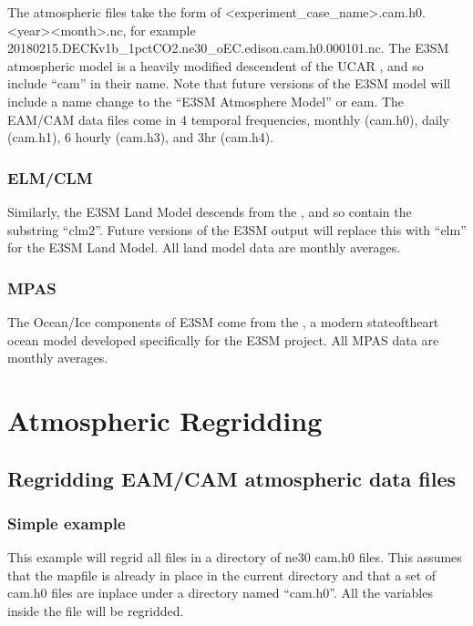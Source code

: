 \documentclass[letterpaper,10pt,english]{sphinxmanual}
\begin{document}
The atmospheric files take the form of \textless{}experiment\_case\_name\textgreater{}.cam.h0.\textless{}year\textgreater{}\sphinxhyphen{}\textless{}month\textgreater{}.nc, for example 20180215.DECKv1b\_1pctCO2.ne30\_oEC.edison.cam.h0.0001\sphinxhyphen{}01.nc. The E3SM atmospheric model is a heavily modified descendent of the
UCAR , and so include “cam” in their name. Note that future versions of the E3SM model will include a name change to the “E3SM Atmosphere Model” or eam. The EAM/CAM
data files come in 4 temporal frequencies, monthly (cam.h0), daily (cam.h1), 6 hourly (cam.h3), and 3hr (cam.h4).


\subsection{ELM/CLM}
\label{\detokenize{guide:elm-clm}}
Similarly, the E3SM Land Model descends from the , and so contain the substring “clm2”. Future versions of the E3SM output will replace this with
“elm” for the E3SM Land Model. All land model data are monthly averages.


\subsection{MPAS}
\label{\detokenize{guide:mpas}}
The Ocean/Ice components of E3SM come from the , a modern state\sphinxhyphen{}of\sphinxhyphen{}the\sphinxhyphen{}art ocean model developed specifically for the E3SM project. All MPAS
data are monthly averages.


\chapter{Atmospheric Regridding}
\label{\detokenize{atm_regrid:atmospheric-regridding}}\label{\detokenize{atm_regrid:atm-regrid}}\label{\detokenize{atm_regrid::doc}}

\section{Regridding EAM/CAM atmospheric data files}
\label{\detokenize{atm_regrid:regridding-eam-cam-atmospheric-data-files}}

\subsection{Simple example}
\label{\detokenize{atm_regrid:simple-example}}
This example will regrid all files in a directory of ne30 cam.h0 files. This assumes that the mapfile is already in place in the current
directory and that a set of cam.h0 files are inplace under a directory named “cam.h0”. All the variables inside the file will be regridded.
\end{document}
